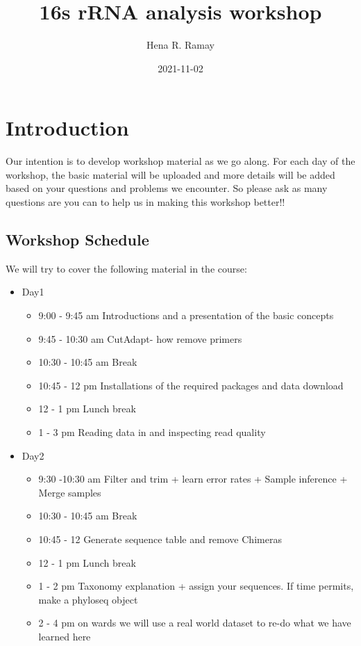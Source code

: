 \documentclass[
]{book}
\title{16s rRNA analysis workshop}
\author{Hena R. Ramay}
\date{2021-11-02}
\providecommand{\tightlist}{%
  \setlength{\itemsep}{0pt}\setlength{\parskip}{0pt}}
\begin{document}
\maketitle

{
\setcounter{tocdepth}{1}
\tableofcontents
}
\hypertarget{introduction}{%
\chapter{Introduction}\label{introduction}}

Our intention is to develop workshop material as we go along. For each day of the workshop, the basic material will be uploaded and more details will be added based on your questions and problems we encounter. So please ask as many questions are you can to help us in making this workshop better!!

\hypertarget{workshop-schedule}{%
\section{Workshop Schedule}\label{workshop-schedule}}

We will try to cover the following material in the course:

\begin{itemize}
\tightlist
\item
  Day1

  \begin{itemize}
  \tightlist
  \item
    9:00 - 9:45 am Introductions and a presentation of the basic concepts
  \item
    9:45 - 10:30 am CutAdapt- how remove primers
  \item
    10:30 - 10:45 am Break
  \item
    10:45 - 12 pm Installations of the required packages and data download
  \item
    12 - 1 pm Lunch break
  \item
    1 - 3 pm Reading data in and inspecting read quality
  \end{itemize}
\item
  Day2

  \begin{itemize}
  \tightlist
  \item
    9:30 -10:30 am Filter and trim + learn error rates + Sample inference + Merge samples
  \item
    10:30 - 10:45 am Break
  \item
    10:45 - 12 Generate sequence table and remove Chimeras
  \item
    12 - 1 pm Lunch break
  \item
    1 - 2 pm Taxonomy explanation + assign your sequences. If time permits, make a phyloseq object
  \item
    2 - 4 pm on wards we will use a real world dataset to re-do what we have learned here
  \end{itemize}
\end{itemize}
\end{document}

